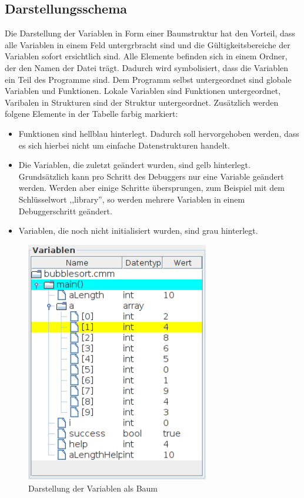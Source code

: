 \subsection{Darstellungsschema}

Die Darstellung der Variablen in Form einer Baumstruktur hat den Vorteil, dass alle Variablen in einem Feld untergrbracht sind und die Gültigkeitsbereiche der Variablen sofort ersichtlich sind.
\newline
Alle Elemente befinden sich in einem Ordner, der den Namen der Datei trägt. Dadurch wird symbolisiert, dass die Variablen ein Teil des Programme sind. Dem Programm selbst untergeordnet sind globale Variablen und Funktionen. Lokale Variablen sind Funktionen untergeordnet, Varibalen in Strukturen sind der Struktur untergeordnet.
\newline
Zusätzlich werden folgene Elemente in der Tabelle farbig markiert:
\begin{itemize}
\item Funktionen sind hellblau hinterlegt. Dadurch soll hervorgehoben werden, dass es sich hierbei nicht um einfache Datenstrukturen handelt.
\item Die Variablen, die zuletzt geändert wurden, sind gelb hinterlegt. Grundsätzlich kann pro Schritt des Debuggers nur eine Variable geändert werden. Werden aber einige Schritte übersprungen, zum Beispiel mit dem Schlüsselwort ,,library'', so werden mehrere Variablen in einem Debuggerschritt geändert.
\item Variablen, die noch nicht initialisiert wurden, sind grau hinterlegt.
\end{itemize}

\begin{figure}
\includegraphics[width=8cm]{./media/images/gui/var/treetable.png}
\caption{Darstellung der Variablen als Baum}
\end{figure}

